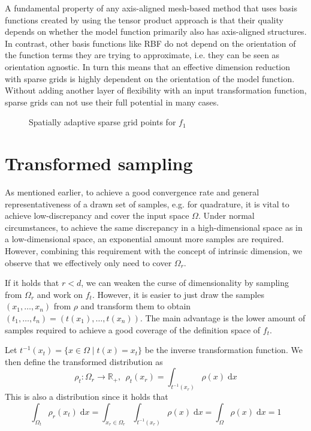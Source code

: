 \documentclass[
  a4paper,  %
  twoside,  %
  bibliography=totoc,
  headsepline,
  cleardoublepage=empty,
  parskip=half,
  draft=false
]{scrbook}
\begin{document}
A fundamental property of any axis-aligned mesh-based method that uses basis functions created by using the tensor product approach is that their quality depends on whether the model function primarily also has axis-aligned structures.
In contrast, other basis functions like RBF do not depend on the orientation of the function terms they are trying to approximate, i.e. they can be seen as orientation agnostic.
In turn this means that an effective dimension reduction with sparse grids is highly dependent on the orientation of the model function.
Without adding another layer of flexibility with an input transformation function, sparse grids can not use their full potential in many cases.



\begin{figure}[H]
  \centering
  \caption{Spatially adaptive sparse grid points for $f_1$}
  \label{fig:grid_errors}
\end{figure}




\section{Transformed sampling}

As mentioned earlier, to achieve a good convergence rate and general representativeness of a drawn set of samples, e.g. for quadrature, it is vital to achieve low-discrepancy and cover the input space $\Omega$.
Under normal circumstances, to achieve the same discrepancy in a high-dimensional space as in a low-dimensional space,
an exponential amount more samples are required.
However, combining this requirement with the concept of intrinsic dimension, we observe that we effectively only need to cover $\Omega_r$.

If it holds that $r < d$, we can weaken the curse of dimensionality by sampling from $\Omega_r$ and work on $f_t$.
However, it is easier to just draw the samples $(x_1, \dots, x_n)$ from $\rho$ and transform them to obtain $(t_1, \dots, t_n)=(t(x_1), \dots, t(x_n))$.
The main advantage is the lower amount of samples required to achieve a good coverage of the definition space of $f_t$.

\begin{definition}
Let $t^{-1}(x_{t})=\{x \in \Omega \mid t(x)=x_{t}\}$ be the inverse transformation function.
We then define the transformed distribution as
\begin{equation}
\rho_t \colon \Omega_r \to \mathds{R_+}, ~~ \rho_t(x_r)=\int_{t^{-1}(x_r)} \rho(x) \; \text{d}x 
\end{equation}
This is also a distribution since it holds that
\begin{equation}
\int_{\Omega_t} \rho_r(x_t) \; \text{d}x=\int_{x_r \in \Omega_r} \int_{t^{-1}(x_r)} \rho(x) \; \text{d}x = \int_{\Omega} \rho(x) \; \text{d}x = 1
\end{equation}
\end{definition}
\end{document}
